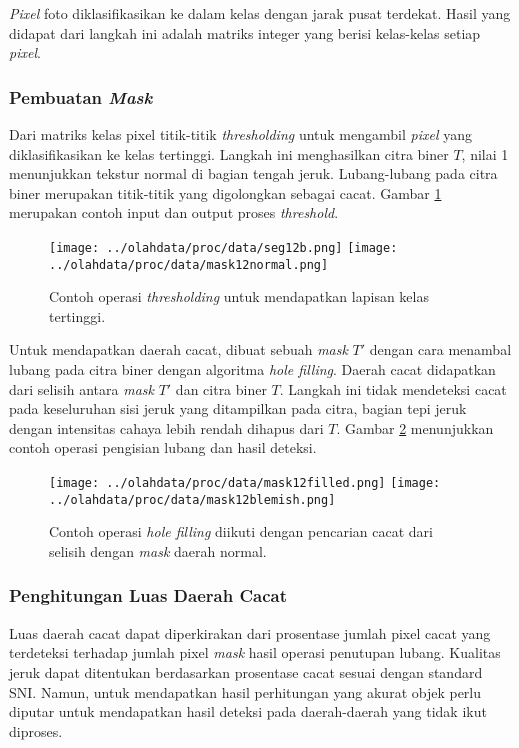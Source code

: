 \documentclass[laporan.tex]{subfiles}
\begin{document}
\emph{Pixel} foto diklasifikasikan ke dalam kelas dengan jarak pusat terdekat. Hasil yang didapat dari langkah ini adalah matriks integer yang berisi kelas-kelas setiap \emph{pixel}.

\subsubsection{Pembuatan \emph{Mask}}

Dari matriks kelas pixel titik-titik \emph{thresholding} untuk mengambil \emph{pixel} yang diklasifikasikan ke kelas tertinggi. Langkah ini menghasilkan citra biner $T$, nilai 1 menunjukkan tekstur normal di bagian tengah jeruk. Lubang-lubang pada citra biner merupakan titik-titik yang digolongkan sebagai cacat. Gambar \ref{fig:highmask} merupakan contoh input dan output proses \emph{threshold}.

\begin{figure}[h]
\centering
\texttt{[image: ../olahdata/proc/data/seg12b.png]} \qquad
\texttt{[image: ../olahdata/proc/data/mask12normal.png]}
\caption{Contoh operasi \emph{thresholding} untuk mendapatkan lapisan kelas tertinggi.}
\label{fig:highmask}
\end{figure}

Untuk mendapatkan daerah cacat, dibuat sebuah \emph{mask} $T'$ dengan cara menambal lubang pada citra biner dengan algoritma \emph{hole filling}. Daerah cacat didapatkan dari selisih antara \emph{mask} $T'$ dan citra biner $T$. Langkah ini tidak mendeteksi cacat pada keseluruhan sisi jeruk yang ditampilkan pada citra, bagian tepi jeruk dengan intensitas cahaya lebih rendah dihapus dari $T$. Gambar \ref{fig:holemask} menunjukkan contoh operasi pengisian lubang dan hasil deteksi.

\begin{figure}[h]
\centering
\texttt{[image: ../olahdata/proc/data/mask12filled.png]} \qquad
\texttt{[image: ../olahdata/proc/data/mask12blemish.png]}
\caption{Contoh operasi \emph{hole filling} diikuti dengan pencarian cacat dari selisih dengan \emph{mask} daerah normal.}
\label{fig:holemask}
\end{figure}

\subsubsection{Penghitungan Luas Daerah Cacat}

Luas daerah cacat dapat diperkirakan dari prosentase jumlah pixel cacat yang terdeteksi terhadap jumlah pixel \emph{mask} hasil operasi penutupan lubang. Kualitas jeruk dapat ditentukan berdasarkan prosentase cacat sesuai dengan standard SNI. Namun, untuk mendapatkan hasil perhitungan yang akurat objek perlu diputar untuk mendapatkan hasil deteksi pada daerah-daerah yang tidak ikut diproses.
\end{document}
